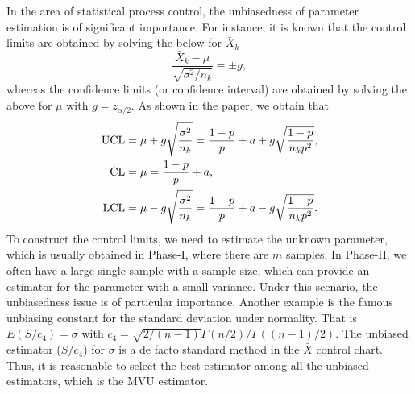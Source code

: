 \documentclass[12pt,a4paper]{article}
\begin{document}
In the area of statistical process control, the unbiasedness of parameter estimation is of significant importance.
For instance, it is known that the control limits are obtained by solving the below for $\bar{X}_k$
\[
\frac{\bar{X}_k - \mu}{\sqrt{\sigma^2 / n_k}} = \pm g,
\]
whereas the confidence limits (or confidence interval) are obtained by solving the above for $\mu$ with $g=z_{\alpha/2}$. As shown in the paper, we obtain that
\begin{align*}
\mathrm{UCL} &= {\mu} + g \sqrt{\frac{\sigma^2}{n_k}} = \frac{1-p}{p}+a  + g\sqrt{\frac{1-p}{n_k p^2}}, \notag \\
\mathrm{CL}  &= {\mu}  = \frac{1-p}{p}+a,   \label{EQ:Limits-h-chart} \notag  \\
\mathrm{LCL} &= {\mu} - g \sqrt{\frac{\sigma^2}{n_k}} = \frac{1-p}{p}+a  - g\sqrt{\frac{1-p}{n_k p^2}} . \notag
\end{align*}
To construct the control limits, we need to estimate the unknown parameter, which is usually
obtained in Phase-I, where there are $m$ samples, In Phase-II, we often have a large single sample
with a sample size, which can provide an estimator for the parameter with a small variance.
Under this scenario, the unbiasedness issue is of particular importance.
Another example is the famous unbiasing constant for the standard deviation under
normality. That is $E(S/c_4) = \sigma$ with $c_4 = \sqrt{2/(n-1)}\Gamma(n/2)/\Gamma((n-1)/2)$.
The unbiased estimator ($S/c_4$) for $\sigma$ is a de facto standard method in the $\bar{X}$ control chart.
Thus, it is reasonable to select the best estimator among all the unbiased estimators, which is the MVU estimator.

\newpage 
\end{document}
